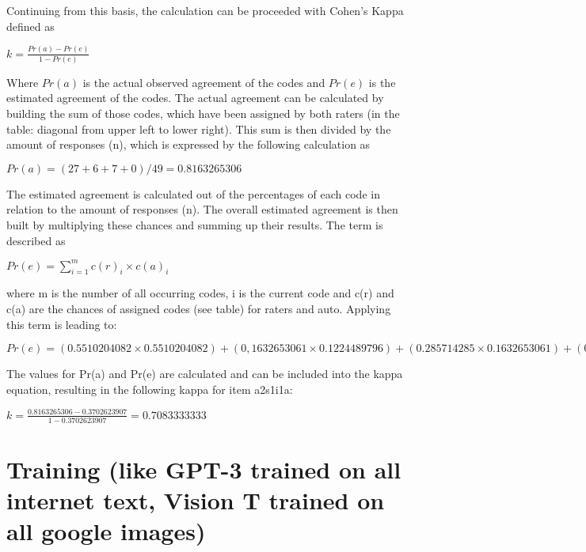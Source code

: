 Continuing from this basis, the calculation can be proceeded with Cohen's Kappa defined as

\begin{center}
$k=\frac{Pr(a) - Pr(e)}{1 - Pr(e)}$
\end{center}

Where $Pr(a)$ is the actual observed agreement of the codes and $Pr(e)$ is the estimated agreement of the codes. The actual agreement can be calculated by building the sum of those codes, which have been assigned by both raters (in the table: diagonal from upper left to lower right). This sum is then divided by the amount of responses (n), which is expressed by the following calculation as 

\begin{center}
$Pr(a) = ( 27 + 6 + 7 + 0 ) / 49 = 0.8163265306$
\end{center}

The estimated agreement is calculated out of the percentages of each code in relation to the amount of responses (n). The overall estimated agreement is then built by multiplying these chances and summing up their results. The term is described as

\begin{center}
$Pr(e) = \displaystyle\sum_{i=1}^{m} c(r)_i \times c(a)_i $
\end{center}

where m is the number of all occurring codes, i is the current code and c(r) and c(a) are the chances of assigned codes (see table) for raters and auto. Applying this term is leading to:


\begin{center}
$Pr(e) =  (0.5510204082 \times 0.5510204082) + (0,1632653061 \times 0.1224489796) + (0.285714285 \times 0.1632653061) + (0 \times 0) = 0.3702623907$
\end{center}

The values for Pr(a) and Pr(e) are calculated and can be included into the kappa equation, resulting in the following kappa for item a2s1i1a:

\begin{center}
 $k=\frac{0.8163265306 -0.3702623907}{1 - 0.3702623907} = 0.7083333333$
\end{center}


\section{Training (like GPT-3 trained on all internet text, Vision T trained on all google images)}

